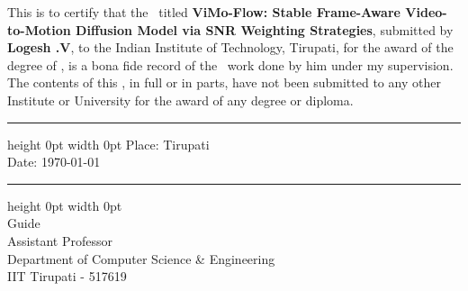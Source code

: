 \certificate

\vspace*{0.5in}

This is to certify that the \thesis~titled {\bf ViMo-Flow: Stable Frame-Aware Video-to-Motion Diffusion Model via SNR Weighting Strategies}, submitted by {\bf Logesh .V}, 
  to the Indian Institute of Technology, Tirupati, for
the award of the degree of \degree, is a bona fide
record of the \research~work done by him under my supervision.  The
contents of this \thesis, in full or in parts, have not been submitted
to any other Institute or University for the award of any degree or
diploma.


\vspace*{1.5in}

\begin{singlespacing}
	\parbox[t]{4cm}{\hrule height 0pt width 0pt
	\noindent Place: Tirupati\\
	\noindent Date: \today \\	
}
\hfill
	\parbox[t]{5cm}{\hrule height 0pt width 0pt
		 \\
		\noindent Guide \\ 
		\noindent Assistant Professor \\
		\noindent Department of Computer Science \& Engineering\\
		\noindent IIT Tirupati - 517619 \\
	}

\end{singlespacing}

